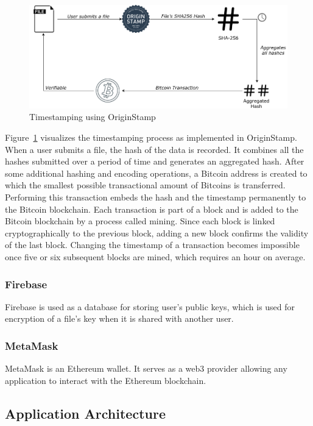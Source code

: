 \begin{figure}[h]
	\includegraphics[width=\linewidth]{figures/origin-stamp}
	\caption{\label{fig:originstamp} Timestamping using OriginStamp}
\end{figure}

Figure~\ref{fig:originstamp} visualizes the timestamping process as implemented in OriginStamp. When a user submits a file, the hash of the data is recorded. It combines all the hashes submitted over a period of time and generates an aggregated hash. After some additional hashing and encoding operations, a Bitcoin address is created to which the smallest possible transactional amount of Bitcoins is transferred. Performing this transaction embeds the hash and the timestamp permanently to the Bitcoin blockchain. Each transaction is part of a block and is added to the Bitcoin blockchain by a process called mining. Since each block is linked cryptographically to the previous block, adding a new block confirms the validity of the last block. Changing the timestamp of a transaction becomes impossible once five or six subsequent blocks are mined, which requires an hour on average\cite{nakamoto2008bitcoin}.

\subsubsection{Firebase}
Firebase\cite{web:firebase:1} is used as a database for storing user's public keys, which is used for encryption of a file's key when it is shared with another user.

\subsubsection{MetaMask}
MetaMask\cite{web:metamask:1} is an Ethereum wallet. It serves as a web3\cite{web:web3:1} provider allowing any application to interact with the Ethereum blockchain.

\subsection{Application Architecture}

